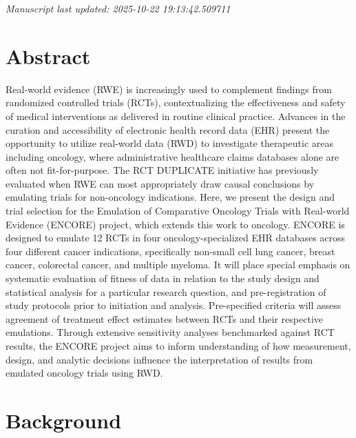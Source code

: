 \documentclass[
  letterpaper,
  DIV=11,
  numbers=noendperiod]{scrartcl}
\begin{document}
\emph{Manuscript last updated: 2025-10-22 19:13:42.509711}

\newpage{}

\section*{Abstract}\label{abstract}

Real-world evidence (RWE) is increasingly used to complement findings
from randomized controlled trials (RCTs), contextualizing the
effectiveness and safety of medical interventions as delivered in
routine clinical practice. Advances in the curation and accessibility of
electronic health record data (EHR) present the opportunity to utilize
real-world data (RWD) to investigate therapeutic areas including
oncology, where administrative healthcare claims databases alone are
often not fit-for-purpose. The RCT DUPLICATE initiative has previously
evaluated when RWE can most appropriately draw causal conclusions by
emulating trials for non-oncology indications. Here, we present the
design and trial selection for the Emulation of Comparative Oncology
Trials with Real-world Evidence (ENCORE) project, which extends this
work to oncology. ENCORE is designed to emulate 12 RCTs in four
oncology-specialized EHR databases across four different cancer
indications, specifically non-small cell lung cancer, breast cancer,
colorectal cancer, and multiple myeloma. It will place special emphasis
on systematic evaluation of fitness of data in relation to the study
design and statistical analysis for a particular research question, and
pre-registration of study protocols prior to initiation and analysis.
Pre-specified criteria will assess agreement of treatment effect
estimates between RCTs and their respective emulations. Through
extensive sensitivity analyses benchmarked against RCT results, the
ENCORE project aims to inform understanding of how measurement, design,
and analytic decisions influence the interpretation of results from
emulated oncology trials using RWD.

\newpage{}

\section{Background}\label{background}
\end{document}
